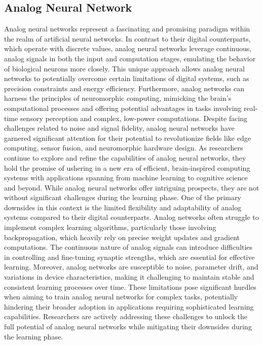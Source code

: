\documentclass[nohyperref]{article}
\theoremstyle{plain}
\theoremstyle{definition}
\theoremstyle{remark}
\begin{document}
\subsection{Analog Neural Network}
Analog neural networks represent a fascinating and promising paradigm within the realm of artificial neural networks. In contrast to their digital counterparts, which operate with discrete values, analog neural networks leverage continuous, analog signals in both the input and computation stages, emulating the behavior of biological neurons more closely. This unique approach allows analog neural networks to potentially overcome certain limitations of digital systems, such as precision constraints and energy efficiency. Furthermore, analog networks can harness the principles of neuromorphic computing, mimicking the brain's computational processes and offering potential advantages in tasks involving real-time sensory perception and complex, low-power computations. Despite facing challenges related to noise and signal fidelity, analog neural networks have garnered significant attention for their potential to revolutionize fields like edge computing, sensor fusion, and neuromorphic hardware design. As researchers continue to explore and refine the capabilities of analog neural networks, they hold the promise of ushering in a new era of efficient, brain-inspired computing systems with applications spanning from machine learning to cognitive science and beyond.
While analog neural networks offer intriguing prospects, they are not without significant challenges during the learning phase. One of the primary downsides in this context is the limited flexibility and adaptability of analog systems compared to their digital counterparts. Analog networks often struggle to implement complex learning algorithms, particularly those involving backpropagation, which heavily rely on precise weight updates and gradient computations. The continuous nature of analog signals can introduce difficulties in controlling and fine-tuning synaptic strengths, which are essential for effective learning. Moreover, analog networks are susceptible to noise, parameter drift, and variations in device characteristics, making it challenging to maintain stable and consistent learning processes over time. These limitations pose significant hurdles when aiming to train analog neural networks for complex tasks, potentially hindering their broader adoption in applications requiring sophisticated learning capabilities. Researchers are actively addressing these challenges to unlock the full potential of analog neural networks while mitigating their downsides during the learning phase.
\end{document}
